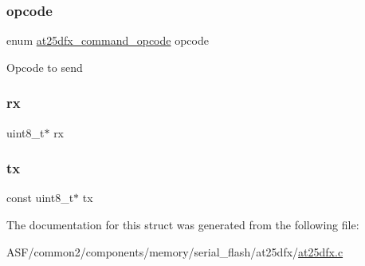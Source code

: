 \subsubsection{\texorpdfstring{opcode}{opcode}}
{\footnotesize\ttfamily enum \mbox{\hyperlink{at25dfx_8c_a6f3ddc55f0728cd3909eee7b5d4ea571}{at25dfx\+\_\+command\+\_\+opcode}} opcode}

Opcode to send \mbox{\label{structat25dfx__command_a3f0a8f4dd90ed4333466ccccacc10fda}} 
\subsubsection{\texorpdfstring{rx}{rx}}
{\footnotesize\ttfamily uint8\+\_\+t$\ast$ rx}

\mbox{\label{structat25dfx__command_a24f3678e750daea4c5d322027cc8244d}} 
\subsubsection{\texorpdfstring{tx}{tx}}
{\footnotesize\ttfamily const uint8\+\_\+t$\ast$ tx}



The documentation for this struct was generated from the following file\+:\begin{DoxyCompactItemize}
\item 
A\+S\+F/common2/components/memory/serial\+\_\+flash/at25dfx/\mbox{\hyperlink{at25dfx_8c}{at25dfx.\+c}}\end{DoxyCompactItemize}

